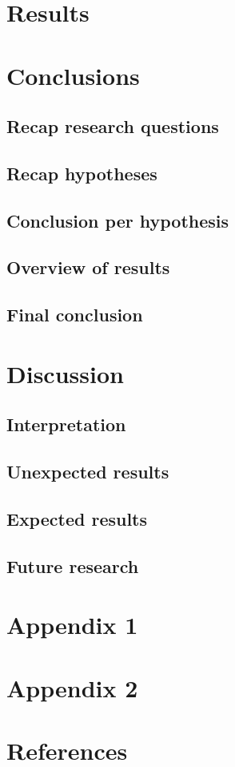 \documentclass{article}
\begin{document}
 \section{Results}
 
 \section{Conclusions}
 \subsection{Recap research questions}
 \subsection{Recap hypotheses}
 \subsection{Conclusion per hypothesis}
 \subsection{Overview of results}
 \subsection{Final conclusion}
 
 \section{Discussion}
 \subsection{Interpretation}
 \subsection{Unexpected results}
 \subsection{Expected results}
 \subsection{Future research}
 
 \begin{appendices}
  \section{Appendix 1}
  \section{Appendix 2}
 \end{appendices}
 
 \section*{References}
 
 
\end{document}
